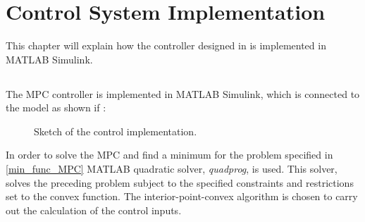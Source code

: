 \chapter{Control System Implementation}
\label{implementation_of_controller}

This chapter will explain how the controller designed in  is implemented in MATLAB Simulink.

\section{}
The MPC controller is implemented in MATLAB Simulink, which is connected to the model as shown if :
\begin{figure}[H]
\centering
 
\caption{Sketch of the control implementation.}
\label{fig:control_sketch}
\end{figure}

In order to solve the MPC and find a minimum for the problem specified in \eqref{min_func_MPC} MATLAB quadratic solver, \textit{quadprog}, is used. This solver, solves the preceding problem subject to the specified constraints and restrictions set to the convex function. The interior-point-convex algorithm is chosen to carry out the calculation of the control inputs. 